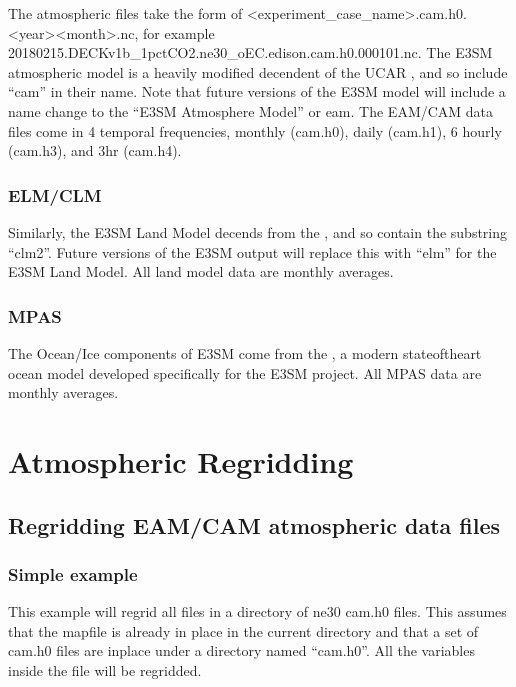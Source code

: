 \documentclass[letterpaper,10pt,english]{sphinxmanual}
\begin{document}
The atmospheric files take the form of \textless{}experiment\_case\_name\textgreater{}.cam.h0.\textless{}year\textgreater{}\sphinxhyphen{}\textless{}month\textgreater{}.nc, for example 20180215.DECKv1b\_1pctCO2.ne30\_oEC.edison.cam.h0.0001\sphinxhyphen{}01.nc. The E3SM atmospheric model is a heavily modified decendent of the
UCAR , and so include “cam” in their name. Note that future versions of the E3SM model will include a name change to the “E3SM Atmosphere Model” or eam. The EAM/CAM
data files come in 4 temporal frequencies, monthly (cam.h0), daily (cam.h1), 6 hourly (cam.h3), and 3hr (cam.h4).


\subsection{ELM/CLM}
\label{\detokenize{guide:elm-clm}}
Similarly, the E3SM Land Model decends from the , and so contain the substring “clm2”. Future versions of the E3SM output will replace this with
“elm” for the E3SM Land Model. All land model data are monthly averages.


\subsection{MPAS}
\label{\detokenize{guide:mpas}}
The Ocean/Ice components of E3SM come from the , a modern state\sphinxhyphen{}of\sphinxhyphen{}the\sphinxhyphen{}art ocean model developed specifically for the E3SM project. All MPAS
data are monthly averages.


\chapter{Atmospheric Regridding}
\label{\detokenize{atm_regrid:atmospheric-regridding}}\label{\detokenize{atm_regrid:atm-regrid}}\label{\detokenize{atm_regrid::doc}}

\section{Regridding EAM/CAM atmospheric data files}
\label{\detokenize{atm_regrid:regridding-eam-cam-atmospheric-data-files}}

\subsection{Simple example}
\label{\detokenize{atm_regrid:simple-example}}
This example will regrid all files in a directory of ne30 cam.h0 files. This assumes that the mapfile is already in place in the current
directory and that a set of cam.h0 files are inplace under a directory named “cam.h0”. All the variables inside the file will be regridded.
\end{document}
